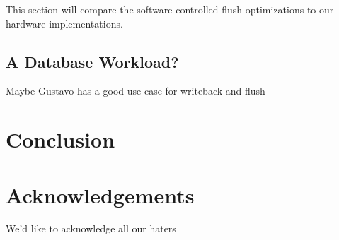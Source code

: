 \documentclass[pageno,hyperref]{jpaper}
\newcommand{\wb}[0]{writeback}
\newcommand{\fl}[0]{flush}
\begin{document}
This section will compare the software-controlled flush optimizations \cite{Wei:FliT:2022} to our hardware implementations.

\subsection{A Database Workload?}

Maybe Gustavo has a good use case for \wb{} and \fl{}



\section{Conclusion}
\label{sec:conclusion}

\section*{Acknowledgements}

We'd like to acknowledge all our haters



\end{document}
